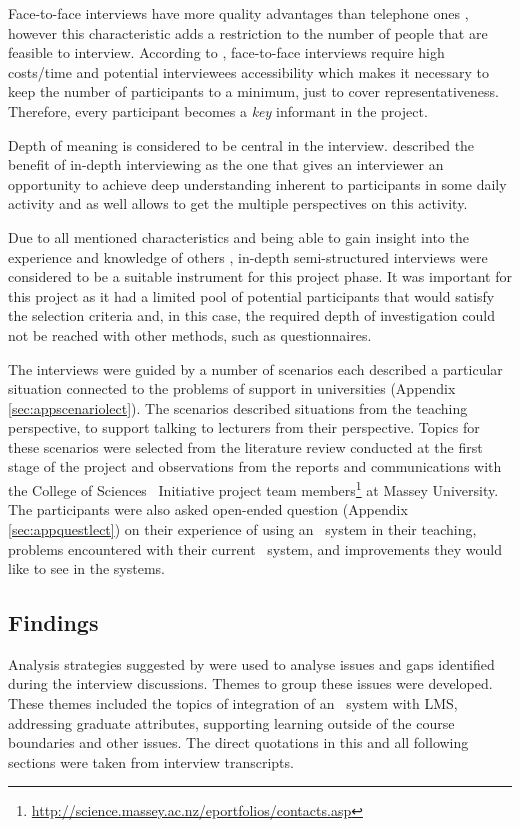 Face-to-face interviews have more quality advantages than telephone ones
\citep{Shuy2001}, however this characteristic adds a restriction to the number
of people that are feasible to interview. According to \citet{Gillham2000},
face-to-face interviews require high costs/time and potential interviewees
accessibility which makes it necessary to keep the number of participants to a
minimum, just to cover representativeness. Therefore, every participant becomes
a \textit{key} informant in the project.

Depth of meaning is considered to be central in the interview.
\citet{Johnson2001} described the benefit of in-depth interviewing as the one
that gives an interviewer an opportunity to achieve deep understanding inherent
to participants in some daily activity and as well allows to get the multiple
perspectives on this activity.

Due to all mentioned characteristics and being able to gain insight into the
experience and knowledge of others \citep{Schostak2006}, in-depth
semi-structured interviews were considered to be a suitable instrument for this
project phase. It was important for this project as it had a limited pool of 
potential participants that would satisfy the selection criteria and, in this
case, the required depth of investigation could not be reached with other
methods, such as questionnaires.

The interviews were guided by a number of scenarios each described a particular
situation connected to the problems of \LLLs support in universities (Appendix
\ref{sec:appscenariolect}). The scenarios described situations from the teaching
perspective, to support talking to lecturers from their perspective. Topics for
these scenarios were selected from the literature review conducted at the first
stage of the project and observations from the reports and communications with
the College of Sciences \ep~Initiative project team
members\footnote{\url{http://science.massey.ac.nz/eportfolios/contacts.asp}} at
Massey University. The participants were also asked open-ended question
(Appendix \ref{sec:appquestlect}) on their experience of using an \ep~system in
their teaching, problems encountered with their current \ep~system, and
improvements they would like to see in the systems.

\subsection{Findings}

Analysis strategies suggested by \citet{Marshall2010} were used to analyse
issues and gaps identified during the interview discussions. Themes to group
these issues were developed. These themes included the topics of integration of
an \ep~system with LMS, addressing graduate attributes, supporting learning
outside of the course boundaries and other issues. The direct quotations in this
and all following sections were taken from interview transcripts.

